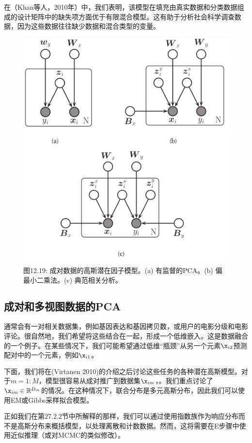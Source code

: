 \documentclass[a4paper]{article}
\begin{document}
在（Khan等人，2010年）中，我们表明，该模型在填充由真实数据和分类数据组成的设计矩阵中的缺失项方面优于有限混合模型。这有助于分析社会科学调查数据，因为这些数据往往缺少数据和混合类型的变量。 

\begin{figure}[h]
	\centering
	\includegraphics[width=0.5\linewidth]{fig/figure19}
	\caption*{图12.19: 成对数据的高斯潜在因子模型。(a) 有监督的PCA。(b) 偏最小二乘法。(c) 典范相关分析。}
\end{figure}

\subsection{成对和多视图数据的PCA}
通常会有一对相关数据集，例如基因表达和基因拷贝数，或用户的电影分级和电影评论。很自然地，我们希望将这些结合在一起，形成一个低维嵌入。这是数据融合的一个例子。在某些情况下，我们可能希望通过低维“瓶颈”从另一个元素$\x_{i2}$预测配对中的一个元素，例如$\x_{i1}$。 

下面，我们将在(Virtanen 2010)的介绍之后讨论这些任务的各种潜在高斯模型。对于$m=1:M$，模型很容易从成对推广到数据集$\x_{im}$，。我们重点讨论了$\x_{im}\in \mathbb{R}^{D_m}$的情况。在这种情况下，联合分布是多元高斯分布，因此我们可以使用EM或Gibbs采样拟合模型。 

正如我们在第27.2.2节中所解释的那样，我们可以通过使用指数族作为响应分布而不是高斯分布来概括模型，以处理离散和计数数据。然而，这将需要在E步骤中使用近似推理（或对MCMC的类似修改）。 
\end{document}
